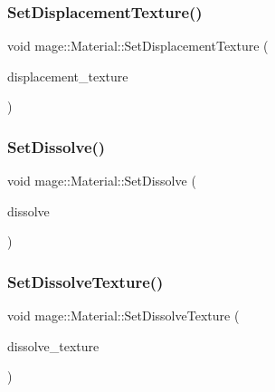 \subsubsection{\texorpdfstring{Set\+Displacement\+Texture()}{SetDisplacementTexture()}}
{\footnotesize\ttfamily void mage\+::\+Material\+::\+Set\+Displacement\+Texture (\begin{DoxyParamCaption}\item[{\hyperlink{namespacemage_a1e01ae66713838a7a67d30e44c67703e}{Shared\+Ptr}$<$ \hyperlink{classmage_1_1_texture}{Texture} $>$}]{displacement\+\_\+texture }\end{DoxyParamCaption})}

\hypertarget{structmage_1_1_material_ad86de160f4e4e03c24329d8f9415ccaa}{}\label{structmage_1_1_material_ad86de160f4e4e03c24329d8f9415ccaa} 
\subsubsection{\texorpdfstring{Set\+Dissolve()}{SetDissolve()}}
{\footnotesize\ttfamily void mage\+::\+Material\+::\+Set\+Dissolve (\begin{DoxyParamCaption}\item[{float}]{dissolve }\end{DoxyParamCaption})\hspace{0.3cm}{\ttfamily [noexcept]}}

\hypertarget{structmage_1_1_material_ae2afaedc1d81fc753b060cca5d86db91}{}\label{structmage_1_1_material_ae2afaedc1d81fc753b060cca5d86db91} 
\subsubsection{\texorpdfstring{Set\+Dissolve\+Texture()}{SetDissolveTexture()}}
{\footnotesize\ttfamily void mage\+::\+Material\+::\+Set\+Dissolve\+Texture (\begin{DoxyParamCaption}\item[{\hyperlink{namespacemage_a1e01ae66713838a7a67d30e44c67703e}{Shared\+Ptr}$<$ \hyperlink{classmage_1_1_texture}{Texture} $>$}]{dissolve\+\_\+texture }\end{DoxyParamCaption})}

